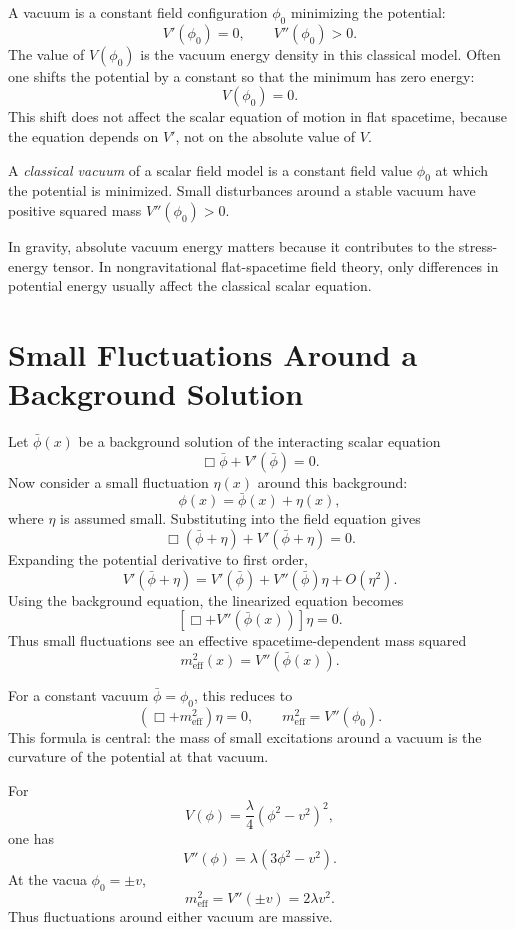 A vacuum is a constant field configuration \(\phi_0\) minimizing the potential:
\[
    V'(\phi_0)=0,
    \qquad
    V''(\phi_0)>0.
\]
The value of \(V(\phi_0)\) is the vacuum energy density in this classical model.
Often one shifts the potential by a constant so that the minimum has zero
energy:
\[
    V(\phi_0)=0.
\]
This shift does not affect the scalar equation of motion in flat spacetime,
because the equation depends on \(V'\), not on the absolute value of \(V\).

\begin{definitionbox}
A \emph{classical vacuum} of a scalar field model is a constant field value
\(\phi_0\) at which the potential is minimized. Small disturbances around a
stable vacuum have positive squared mass \(V''(\phi_0)>0\).
\end{definitionbox}

In gravity, absolute vacuum energy matters because it contributes to the
stress-energy tensor. In nongravitational flat-spacetime field theory, only
differences in potential energy usually affect the classical scalar equation.

\section{Small Fluctuations Around a Background Solution}

Let \(\bar\phi(x)\) be a background solution of the interacting scalar equation
\[
    \Box\bar\phi+V'(\bar\phi)=0.
\]
Now consider a small fluctuation \(\eta(x)\) around this background:
\[
    \phi(x)=\bar\phi(x)+\eta(x),
\]
where \(\eta\) is assumed small. Substituting into the field equation gives
\[
    \Box(\bar\phi+\eta)+V'(\bar\phi+\eta)=0.
\]
Expanding the potential derivative to first order,
\[
    V'(\bar\phi+\eta)=V'(\bar\phi)+V''(\bar\phi)\eta+O(\eta^2).
\]
Using the background equation, the linearized equation becomes
\[
    \left[\Box+V''(\bar\phi(x))\right]\eta=0.
\]
Thus small fluctuations see an effective spacetime-dependent mass squared
\[
    m_{\mathrm{eff}}^2(x)=V''(\bar\phi(x)).
\]

For a constant vacuum \(\bar\phi=\phi_0\), this reduces to
\[
    (\Box+m_{\mathrm{eff}}^2)\eta=0,
    \qquad
    m_{\mathrm{eff}}^2=V''(\phi_0).
\]
This formula is central: the mass of small excitations around a vacuum is the
curvature of the potential at that vacuum.

\begin{examplebox}
For
\[
    V(\phi)=\frac{\lambda}{4}(\phi^2-v^2)^2,
\]
one has
\[
    V''(\phi)=\lambda(3\phi^2-v^2).
\]
At the vacua \(\phi_0=\pm v\),
\[
    m_{\mathrm{eff}}^2=V''(\pm v)=2\lambda v^2.
\]
Thus fluctuations around either vacuum are massive.
\end{examplebox}

